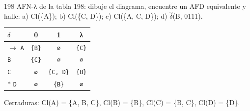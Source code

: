 \documentclass[11pt]{article}
\begin{document}
\begin{ejercicio}{198}{}
AFN-λ de la tabla 198: dibuje el diagrama, encuentre un AFD equivalente y halle: a) Cl(\{A\}); b) Cl(\{C, D\}); c) Cl(\{A, C, D\}); d) $\hat\delta$(B, 0111).
\end{ejercicio}
\proc \begin{center}\small\begin{tabular}{lccc}\toprule
$\delta$ & 0 & 1 & λ \\\midrule
$\to$ \texttt{A} & \texttt{\{B\}} & \texttt{∅} & \texttt{\{C\}} \\
 \texttt{B} & \texttt{\{C\}} & \texttt{∅} & \texttt{∅} \\
 \texttt{C} & \texttt{∅} & \texttt{\{C, D\}} & \texttt{\{B\}} \\
$*$ \texttt{D} & \texttt{∅} & \texttt{\{B\}} & \texttt{∅} \\
\bottomrule\end{tabular}\end{center}
Cerraduras: Cl(A) = \{A, B, C\}, Cl(B) = \{B\}, Cl(C) = \{B, C\}, Cl(D) = \{D\}.
\end{document}
